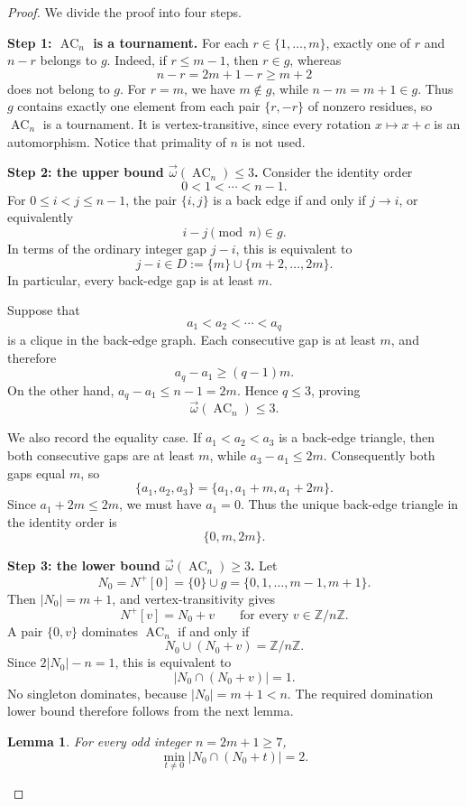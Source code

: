 \documentclass[11pt]{article}
\newtheorem{lemma}{Lemma}
\newcommand{\Z}{\mathbb{Z}}
\newcommand{\tomega}{\vec{\omega}}
\newcommand{\AC}{\operatorname{AC}}
\begin{document}
\begin{proof}
We divide the proof into four steps.

\medskip
\noindent
\textbf{Step 1: \(\AC_n\) is a tournament.}
For each \(r\in\{1,\ldots,m\}\), exactly one of \(r\) and \(n-r\)
belongs to \(g\). Indeed, if \(r\leq m-1\), then \(r\in g\), whereas
\[
  n-r=2m+1-r\geq m+2
\]
does not belong to \(g\). For \(r=m\), we have \(m\notin g\), while
\(n-m=m+1\in g\). Thus \(g\) contains exactly one element from each
pair \(\{r,-r\}\) of nonzero residues, so \(\AC_n\) is a tournament.
It is vertex-transitive, since every rotation \(x\mapsto x+c\) is an
automorphism. Notice that primality of \(n\) is not used.

\medskip
\noindent
\textbf{Step 2: the upper bound \(\tomega(\AC_n)\leq 3\).}
Consider the identity order
\[
  0<1<\cdots<n-1.
\]
For \(0\leq i<j\leq n-1\), the pair \(\{i,j\}\) is a back edge if and
only if \(j\to i\), or equivalently
\[
  i-j\pmod n\in g.
\]
In terms of the ordinary integer gap \(j-i\), this is equivalent to
\[
  j-i\in
  D:=\{m\}\cup\{m+2,\ldots,2m\}.
\]
In particular, every back-edge gap is at least \(m\).

Suppose that
\[
  a_1<a_2<\cdots<a_q
\]
is a clique in the back-edge graph. Each consecutive gap is at least
\(m\), and therefore
\[
  a_q-a_1\geq(q-1)m.
\]
On the other hand, \(a_q-a_1\leq n-1=2m\). Hence \(q\leq 3\), proving
\[
  \tomega(\AC_n)\leq 3.
\]

We also record the equality case. If
\(a_1<a_2<a_3\) is a back-edge triangle, then both consecutive gaps
are at least \(m\), while \(a_3-a_1\leq2m\). Consequently both gaps
equal \(m\), so
\[
  \{a_1,a_2,a_3\}
  =
  \{a_1,a_1+m,a_1+2m\}.
\]
Since \(a_1+2m\leq2m\), we must have \(a_1=0\). Thus the unique
back-edge triangle in the identity order is
\[
  \{0,m,2m\}.
\]

\medskip
\noindent
\textbf{Step 3: the lower bound \(\tomega(\AC_n)\geq3\).}
Let
\[
  N_0=N^+[0]
  =
  \{0\}\cup g
  =
  \{0,1,\ldots,m-1,m+1\}.
\]
Then \(|N_0|=m+1\), and vertex-transitivity gives
\[
  N^+[v]=N_0+v
  \qquad\text{for every }v\in\Z/n\Z.
\]
A pair \(\{0,v\}\) dominates \(\AC_n\) if and only if
\[
  N_0\cup(N_0+v)=\Z/n\Z.
\]
Since \(2|N_0|-n=1\), this is equivalent to
\[
  |N_0\cap(N_0+v)|=1.
\]
No singleton dominates, because \(|N_0|=m+1<n\). The required
domination lower bound therefore follows from the next lemma.

\begin{lemma}\label{lem:overlap}
For every odd integer \(n=2m+1\geq7\),
\[
  \min_{t\neq0}|N_0\cap(N_0+t)|=2.
\]
\end{lemma}


\end{proof}
\end{document}
